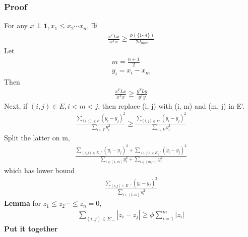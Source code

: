 \documentclass[12pt, letterpaper]{report}
\begin{document}
    \subsubsection{Proof}
    For any $x\perp \mathbf{1}, x_1\leq x_2 \cdots x_n$, $\exists i$
    \begin{gather*}
        \frac{x^T Lx}{x^Tx} \geq \frac{\phi(\{1\cdots i\})}{2d_{max}}
    \end{gather*}
    Let
    \begin{gather*}
        m = \frac{n+1}{2}\\
        y_i=x_i-x_m
    \end{gather*}
    Then
    \begin{gather*}
        \frac{x^TLx}{x^Tx} \geq \frac{y^TLy}{y^Ty}
    \end{gather*}
    Next, if $(i,j)\in E, i<m<j$, then replace (i, j) with (i, m) and (m, j) in E'.
    \begin{gather*}
        \frac{\sum_{(i,j)\in E}(y_i-y_j)^2}{\sum_{i\in V}y_i^2} \geq \frac{\sum_{(i,j)\in E'}(y_i-y_j)^2}{\sum_{i\in V}y_i^2}
    \end{gather*}
    Split the latter on m,
    \begin{gather*}
        \frac{\sum_{(i,j)\in E_{-}'}(y_i-y_j)^2+\sum_{(i,j)\in E_{+}'}(y_i-y_j)^2}{\sum_{i\in [1,m]}y_i^2+\sum_{i\in [m,n]}y_i^2}
    \end{gather*}
    which has lower bound
    \begin{gather*}
        \frac{\sum_{(i,j)\in E_{-}'}(y_i-y_j)^2}{\sum_{i\in [1,m]}y_i^2}
    \end{gather*}
    \textbf{Lemma} for $z_1\leq z_2 \cdots \leq z_n = 0$, 
    \begin{gather*}
        \sum_{(i,j)\in E'_{-}}|z_i-z_j|\geq \phi \sum_{i=1}^{m}|z_i|
    \end{gather*}
    \textbf{Put it together}
\end{document}
